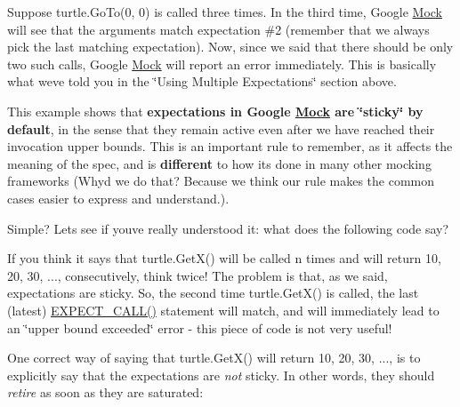 Suppose {\ttfamily turtle.\+Go\+To(0, 0)} is called three times. In the third time, Google \mbox{\hyperlink{class_mock}{Mock}} will see that the arguments match expectation \#2 (remember that we always pick the last matching expectation). Now, since we said that there should be only two such calls, Google \mbox{\hyperlink{class_mock}{Mock}} will report an error immediately. This is basically what we\textquotesingle{}ve told you in the \char`\"{}\+Using Multiple Expectations\char`\"{} section above.

This example shows that {\bfseries{expectations in Google \mbox{\hyperlink{class_mock}{Mock}} are \char`\"{}sticky\char`\"{} by default}}, in the sense that they remain active even after we have reached their invocation upper bounds. This is an important rule to remember, as it affects the meaning of the spec, and is {\bfseries{different}} to how it\textquotesingle{}s done in many other mocking frameworks (Why\textquotesingle{}d we do that? Because we think our rule makes the common cases easier to express and understand.).

Simple? Let\textquotesingle{}s see if you\textquotesingle{}ve really understood it\+: what does the following code say?


\begin{DoxyCode}{0}
\DoxyCodeLine{\}}
\end{DoxyCode}


If you think it says that {\ttfamily turtle.\+Get\+X()} will be called {\ttfamily n} times and will return 10, 20, 30, ..., consecutively, think twice! The problem is that, as we said, expectations are sticky. So, the second time {\ttfamily turtle.\+Get\+X()} is called, the last (latest) {\ttfamily \mbox{\hyperlink{googletest-master_2googlemock_2include_2gmock_2gmock-spec-builders_8h_a535a6156de72c1a2e25a127e38ee5232}{E\+X\+P\+E\+C\+T\+\_\+\+C\+A\+L\+L()}}} statement will match, and will immediately lead to an \char`\"{}upper bound exceeded\char`\"{} error -\/ this piece of code is not very useful!

One correct way of saying that {\ttfamily turtle.\+Get\+X()} will return 10, 20, 30, ..., is to explicitly say that the expectations are {\itshape not} sticky. In other words, they should {\itshape retire} as soon as they are saturated\+:


\begin{DoxyCode}{0}
\DoxyCodeLine{\}}
\end{DoxyCode}


